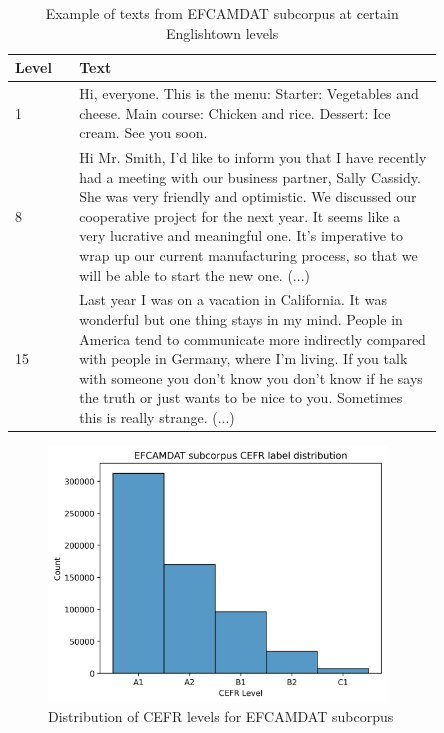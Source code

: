 \documentclass[11pt,a4paper]{article}
\begin{document}
\begin{table}
  \centering
  \begin{tabular}{l|p{0.85\linewidth}}
    \toprule
    Level & Text  \\
    \midrule
    1 & Hi, everyone. This is the menu: Starter: Vegetables and cheese. Main
    course: Chicken and rice. Dessert: Ice cream. See you soon.\\
    \midrule
    8 & Hi Mr. Smith, I'd like to inform you that I have recently had a meeting
    with our business partner, Sally Cassidy. She was very friendly and
    optimistic. We discussed our cooperative project for the next year. It
    seems like a very lucrative and meaningful one. It's imperative to wrap up
    our current manufacturing process, so that we will be able to start the new
    one. (...)\\
    \midrule
    15 & Last year I was on a vacation in California. It was wonderful but
    one thing stays in my mind. People in America tend to communicate more
    indirectly compared with people in Germany, where I'm living. If you talk
    with someone you don't know you don't know if he says the truth or just
    wants to be nice to you. Sometimes this is really strange. (...)\\
    \bottomrule
  \end{tabular}
  \caption{Example of texts from EFCAMDAT subcorpus at certain Englishtown levels}
  \label{tab:efcamdat-examples}
\end{table}

\begin{figure}
  \centering
  \includegraphics[width=0.8\textwidth]{figures/cefr-distribution-efcamdat.png}
  \caption{Distribution of CEFR levels for EFCAMDAT subcorpus}
  \label{fig:efcamdat-distribution}
\end{figure}
\end{document}
